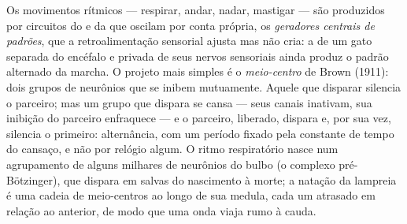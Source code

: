 \begin{proposition}\label{prop:b3:nervous-systems:cpg}
Os movimentos rítmicos --- respirar, andar, nadar, mastigar --- são
produzidos por circuitos do  e da  que
oscilam por conta própria, os \emph{geradores centrais de padrões}, que
a retroalimentação sensorial ajusta mas não cria: a  de um
gato separada do encéfalo e privada de seus nervos sensoriais ainda
produz o padrão alternado da marcha. O projeto mais simples é o
\emph{meio-centro} de Brown (1911): dois grupos de neurônios que se
inibem mutuamente. Aquele que disparar silencia o parceiro; mas um grupo
que dispara se cansa --- seus canais inativam, sua inibição do parceiro
enfraquece --- e o parceiro, liberado, dispara e, por sua vez, silencia
o primeiro: alternância, com um período fixado pela constante de tempo
do cansaço, e não por relógio algum. O ritmo respiratório nasce num
agrupamento de alguns milhares de neurônios do bulbo (o complexo
pré-Bötzinger), que dispara em salvas do nascimento à morte; a natação
da lampreia é uma cadeia de meio-centros ao longo de sua medula, cada
um atrasado em relação ao anterior, de modo que uma onda viaja rumo à
cauda.
\end{proposition}

